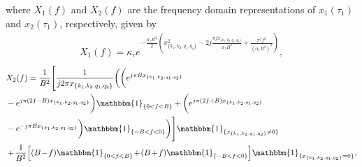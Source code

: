 where $X_{1}(f)$ and $X_{2}(f)$ are the frequency domain representations of $x_1(\tau_1)$ and $x_2(\tau_1)$, respectively, given by
\begin{align}
X_{1}(f)=\kappa_\tau
e^{-\frac{\alpha_{\tau}B^{2}}{2}\left(x_{\{k_1,k_2,q_1,q_2\}}^{2}-2j\frac{\pi fx_{\{k_1,k_2,q_1,q_2\}}}{\alpha_{\tau}B^{2}}
+\frac{\pi^{2}f^{2}}{(\alpha_{\tau}B^{2})^{2}}\right)},
\end{align}
\begin{align}
& X_{2}(f)=\frac{1}{B^{2}} \Bigg[\frac{1}{j2\pi x_{\{k_1,k_2,q_1,q_2\}}}\bigg(\bigg(e^{j\pi Bx_{\{k_1,k_2,q_1,q_2\}}} \nonumber \\
&-e^{j\pi (2f-B)x_{\{k_1,k_2,q_1,q_2\}}}\bigg) \mathbbm{1}_{\{0<f<B\}}
+ \bigg(e^{j\pi (2f+B)x_{\{k_1,k_2,q_1,q_2\}}} \nonumber \\
&-e^{-j\pi Bx_{\{k_1,k_2,q_1,q_2\}}}\bigg)\mathbbm{1}_{\{-B<f<0\}}\bigg)\Bigg]\mathbbm{1}_{\{x_{\{k_1,k_2,q_1,q_2\}}\neq 0\}} \nonumber \\
& + \hspace{-0.5mm} \frac{1}{B^{2}}\Big[(B \hspace{-0.5mm} - \hspace{-0.5mm} f)\mathbbm{1}_{\{0<f<B\}} \hspace{-0.5mm} + \hspace{-0.5mm} (B \hspace{-0.5mm} + \hspace{-0.5mm} f)\mathbbm{1}_{\{-B<f<0\}}\Big]\mathbbm{1}_{\{x_{\{k_1,k_2,q_1,q_2\}}=0\}},
\end{align}
 
